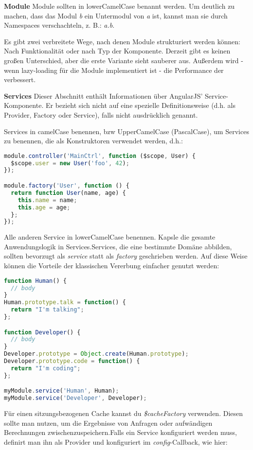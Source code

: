 \textbf{Module\newline}
Module sollten in lowerCamelCase benannt werden. Um deutlich zu machen, dass das Modul \textit{b} ein Untermodul von \textit{a} ist, kannst man sie durch Namespaces verschachteln, z. B.: \textit{a.b}.

Es gibt zwei verbreitete Wege, nach denen Module strukturiert werden können: Nach Funktionalität
oder nach Typ der Komponente. Derzeit gibt es keinen großen Unterschied, aber die erste Variante sieht sauberer aus. Außerdem wird - wenn lazy-loading für die Module implementiert ist - die Performance der verbessert.

\textbf{Services\newline}
Dieser Abschnitt enthält Informationen über AngularJS' Service-Komponente. Er bezieht sich nicht auf eine spezielle Definitionsweise (d.h. als Provider, Factory oder Service), falls nicht ausdrücklich genannt.

Services in camelCase benennen, bzw UpperCamelCase (PascalCase), um Services zu benennen, die als Konstruktoren verwendet werden, d.h.:

\begin{lstlisting}[language=JavaScript]
module.controller('MainCtrl', function ($scope, User) {
  $scope.user = new User('foo', 42);
});

module.factory('User', function () {
  return function User(name, age) {
    this.name = name;
    this.age = age;
  };
});
\end{lstlisting}

Alle anderen Service in lowerCamelCase benennen. Kapsle die gesamte Anwendungslogik in Services.Services, die eine bestimmte Domäne abbilden, sollten bevorzugt als \textit{service} statt als \textit{factory} geschrieben werden. Auf diese Weise können die Vorteile der klassischen Vererbung einfacher genutzt werden:

\begin{lstlisting}[language=JavaScript]
function Human() {
  // body
}
Human.prototype.talk = function() {
  return "I'm talking";
};

function Developer() {
  // body
}
Developer.prototype = Object.create(Human.prototype);
Developer.prototype.code = function() {
  return "I'm coding";
};

myModule.service('Human', Human);
myModule.service('Developer', Developer);
\end{lstlisting}

Für einen sitzungsbezogenen Cache kannst du \textit{\$cacheFactory} verwenden. Diesen sollte man nutzen, um die Ergebnisse von Anfragen oder aufwändigen Berechnungen zwischenzuspeichern.Falls ein Service konfiguriert werden muss, definirt man ihn als Provider und konfiguriert im \textit{config}-Callback, wie hier:

